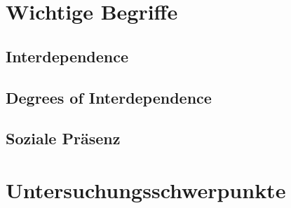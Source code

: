 \section{Wichtige Begriffe}

\subsection{Interdependence}

\subsection{Degrees of Interdependence}

\subsection{Soziale Präsenz}



\section{Untersuchungsschwerpunkte}

